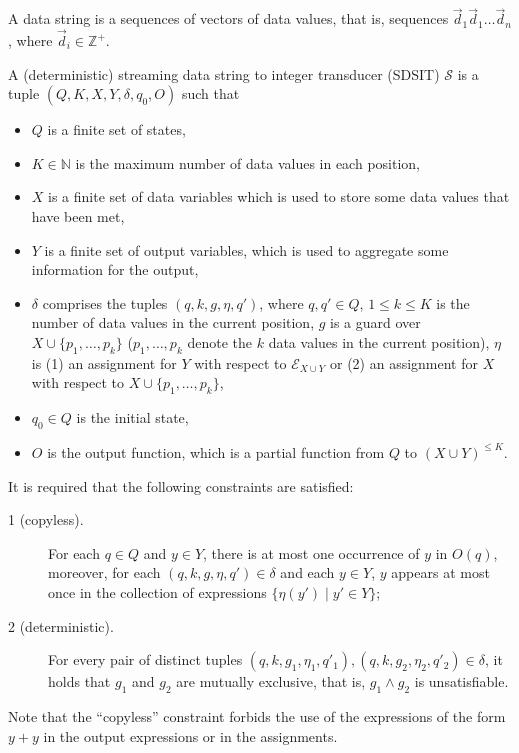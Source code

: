\documentclass[11pt]{article}
\def\Ee{{\mathcal{E} }}
\def\Nn{{\mathbb{N} }}
\def\Ss{{\mathcal{S} }}
\def\Ii{{\mathbb{Z} }}
\newcommand{\zhilin}[1]{\color{cyan} {ZL: #1 :LZ} \color{black}}
\newcommand{\lei}[1]{\color{green} {LE: #1 :EL} \color{black}}
\begin{document}
A data string is a sequences of vectors of data values, that is, sequences $\vec{d}_1\vec{d}_1\dots \vec{d}_n$, where $\vec{d}_i \in \Ii^+$.

A (deterministic) streaming data string to integer transducer (SDSIT) $\Ss$ is a tuple $(Q, K, X, Y, \delta, q_0, O)$ such that 
\begin{itemize}
\item $Q$ is a finite set of states,
\item $K \in \Nn$ is the maximum number of data values in each position, 
\item $X$ is a finite set of data variables which is used to store some data values that have been met,
\item $Y$ is a finite set of output variables, which is used to aggregate some information for the output,
\item $\delta$ comprises the tuples $(q, k, g, \eta, q')$, where $q,q'\in Q $, $1 \le k \le K$ is the number of data values in the current position, $g$ is a guard over $X \cup \{p_1,\dots,p_k\}$ ($p_1,\dots,p_k$ denote the $k$ data values in the current position), $\eta$ is (1) an assignment for $Y$ with respect to $\Ee_{X \cup Y}$ or (2) an assignment for $X$ with respect to $X \cup \{p_1,\dots,p_k\}$, 
\item $q_0 \in Q$ is the initial state,
\item $O$ is the output function, which is a partial function from $Q$ to $(X \cup Y)^{\le K}$.
\end{itemize}
It is required that the following constraints are satisfied: 
\begin{description}
\item[1 (copyless).] For each $q \in Q$ and $y \in Y$, there is at most one occurrence of $y$ in $O(q)$, moreover, for each $(q,k, g, \eta, q') \in \delta$ and each $y \in Y$, $y$ appears at most once in the collection of expressions $\{\eta(y') \mid y' \in Y\}$; 
\item [2 (deterministic).] For every pair of distinct tuples $(q,k, g_1, \eta_1,q'_1), (q, k, g_2,\eta_2,q'_2) \in \delta$, it holds that $g_1$ and $g_2$ are mutually exclusive, that is, $g_1 \wedge g_2$ is unsatisfiable.
\end{description}
Note that the ``copyless'' constraint forbids the use of the expressions of the form $y+y$ in the output expressions or in the assignments.
\end{document}
